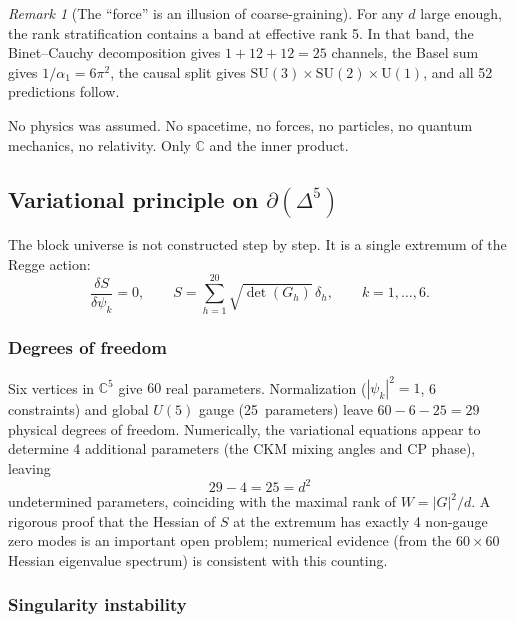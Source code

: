 \documentclass[12pt]{article}
\theoremstyle{remark}
\newtheorem{remark}[theorem]{Remark}
\theoremstyle{definition}
\newcommand{\CC}{\mathbb{C}}
\begin{document}
\begin{remark}[The ``force'' is an illusion of coarse-graining]
For any $d$ large enough, the rank stratification contains a band at effective rank 5. In that band, the Binet--Cauchy decomposition gives $1 + 12 + 12 = 25$ channels, the Basel sum gives $1/\alpha_1 = 6\pi^2$, the causal split gives $\text{SU}(3) \times \text{SU}(2) \times \text{U}(1)$, and all 52 predictions follow.

No physics was assumed. No spacetime, no forces, no particles, no quantum mechanics, no relativity. Only $\CC$ and the inner product.

\subsection{Variational principle on $\partial(\Delta^5)$}
\label{sec:variational}

The block universe is not constructed step by step.  It is a single extremum of the Regge action:
\begin{equation}
\frac{\delta S}{\delta\psi_k} = 0, \qquad S = \sum_{h=1}^{20} \sqrt{\det(G_h)}\,\delta_h, \qquad k = 1,\ldots,6.
\end{equation}

\subsubsection{Degrees of freedom}

Six vertices in $\CC^5$ give $60$ real parameters.  Normalization ($|{\psi_k}|^2 = 1$, 6 constraints) and global $U(5)$ gauge (25~parameters) leave $60 - 6 - 25 = 29$ physical degrees of freedom.  Numerically, the variational equations appear to determine 4 additional parameters (the CKM mixing angles and CP phase), leaving
\begin{equation}
29 - 4 = 25 = d^2
\end{equation}
undetermined parameters, coinciding with the maximal rank of $W = |G|^2/d$.  A rigorous proof that the Hessian of $S$ at the extremum has exactly 4 non-gauge zero modes is an important open problem; numerical evidence (from the $60\times60$ Hessian eigenvalue spectrum) is consistent with this counting.

\subsubsection{Singularity instability}


\end{remark}
\end{document}
